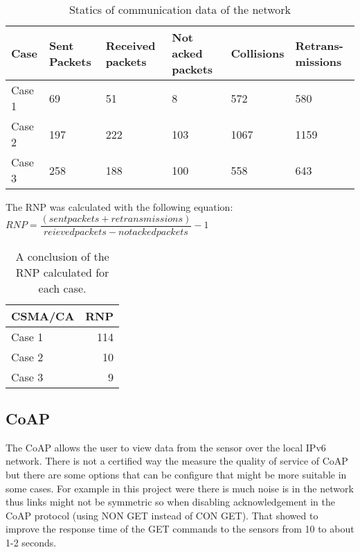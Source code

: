 \begin{table}[htbp]
	\caption{Statics of communication data of the network}
	\label{fig:qos}
	\begin{center}
		\begin{tabular}{p{1cm}p{.9cm}p{1cm}p{1.2cm}p{1cm}p{1cm}}
			\hline
			Case& Sent Packets & Received packets & Not acked packets & Collisions & Retrans-missions \\ \hline
			Case 1 & 69 & 51 & 8 & 572&580 \\ 
			Case 2 & 197 & 222 & 103 & 1067&1159 \\ 
			Case 3 & 258 & 188 & 100 & 558&643 \\ \hline
		\end{tabular}
	\end{center}
	
\end{table}
The RNP was calculated with the following equation:\\

$RNP = \dfrac{ (sent packets + retransmissions)}{reieved packets - not acked packets} -1 $

\begin{table}[htbp]
	\caption{A conclusion of the RNP calculated for each case.}
	\label{fig:rnp}
	\begin{center}
		\begin{tabular}{lr}
			\hline
			CSMA/CA &RNP \\ \hline
			Case 1&114 \\ 
			Case 2&10 \\ 
			Case 3&9 \\ \hline
		\end{tabular}
	\end{center}
	
\end{table}


\subsection{CoAP}

The CoAP allows the user to view data from the sensor over the local IPv6 network. There is not a certified way the measure the quality of service of CoAP but there are some options that can be configure that might be more suitable in some cases. For example in this project were there is much noise is in the network thus links might not be symmetric so when disabling acknowledgement in the CoAP protocol (using NON GET instead of CON GET). That showed to improve the response time of the GET commands to the sensors from 10 to about 1-2 seconds.